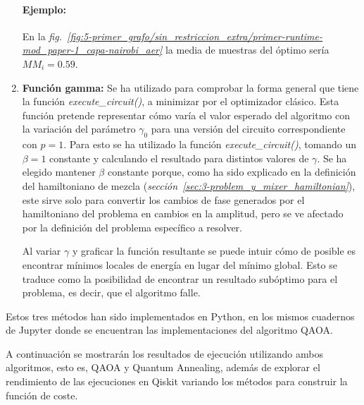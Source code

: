 \begin{enumerate}
  \paragraph{Ejemplo:}
  En la \textit{fig.~\ref{fig:5-primer_grafo/sin_restriccion_extra/primer-runtime-mod_paper-1_capa-nairobi_aer}} la media de muestras del óptimo sería $\textit{MM}_i = 0.59$.
  
\item \textbf{Función gamma:}
  Se ha utilizado para comprobar la forma general que tiene la función \textit{execute\_circuit()}, a minimizar por el optimizador clásico.
  Esta función pretende representar cómo varía el valor esperado del algoritmo con la variación del parámetro $\gamma_0$ para una versión del circuito correspondiente con $p = 1$.
  Para esto se ha utilizado la función \textit{execute\_circuit()}, tomando un $\beta = 1$ constante y calculando el resultado para distintos valores de $\gamma$.
  Se ha elegido mantener $\beta$ constante porque, como ha sido explicado en la definición del hamiltoniano de mezcla (\textit{sección~\ref{sec:3-problem_y_mixer_hamiltonian}}), este sirve solo para convertir los cambios de fase generados por el hamiltoniano del problema en cambios en la amplitud, pero se ve afectado por la definición del problema específico a resolver.

  Al variar \(\gamma\) y graficar la función resultante se puede intuir cómo de posible es encontrar mínimos locales de energía en lugar del mínimo global.
  Esto se traduce como la posibilidad de encontrar un resultado subóptimo para el problema, es decir, que el algoritmo falle.
\end{enumerate}

Estos tres métodos han sido implementados en Python, en los mismos cuadernos de Jupyter donde se encuentran las implementaciones del algoritmo QAOA\cite{codigo_tfg}.

A continuación se mostrarán los resultados de ejecución utilizando ambos algoritmos, esto es, QAOA y Quantum Annealing, además de explorar el rendimiento de las ejecuciones en Qiskit variando los métodos para construir la función de coste.


